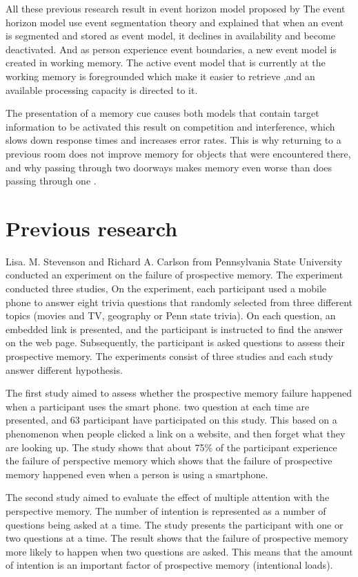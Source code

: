 All these previous research result in event horizon model proposed by \cite{Radvansky2012}
The event horizon model use event segmentation theory and explained that when an event is
segmented and stored as event model, it declines in availability and become deactivated. And
as person experience event boundaries, a new event model is created in working memory. The
active event model that is currently at the working memory is foregrounded which make it easier
to retrieve ,and an available processing capacity is directed to it.

The presentation of a memory cue causes both models that contain target information to
be activated this result on competition and interference, which slows down response times and
increases error rates. This is why returning to a previous room does not improve memory for
objects that were encountered there, and why passing through two doorways makes memory even
worse than does passing through one \citep{Radvansky2011}.


\section{Previous research}
Lisa. M. Stevenson and Richard A. Carlson from Pennsylvania State University conducted an
experiment on the failure of prospective memory. The experiment conducted three studies,
On the experiment, each participant used a mobile phone to answer eight trivia questions that randomly selected from three different topics (movies and TV, geography or Penn state trivia). On each question, an embedded link is presented, and the participant is instructed to find the answer on the web page. Subsequently, the participant is asked questions to assess their prospective memory. The experiments consist of three studies and each study
answer different hypothesis.

The first study aimed to assess whether the prospective memory failure happened when
a participant uses the smart phone.
two question at each time are presented, and 63 participant have participated on this study.
This based on a phenomenon when people clicked a link
on a website, and then forget what they are looking up. The study shows that about 75\% of the
participant experience the failure of perspective memory which shows that the failure of prospective memory happened even when a person is using a smartphone.

The second study aimed to evaluate the
effect of multiple attention  with the perspective memory. The number of intention is represented
as a number of questions being asked at a time. The study presents the participant with one or
two questions at a time. The result shows that the failure of prospective memory more likely to
happen when two questions are asked. This means that the amount of intention is an important factor of prospective memory (intentional loads).

